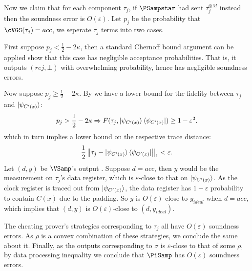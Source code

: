 \begin{prf}
	
	
	Now we claim that for each component $\tau_j$,
	if $\PSampstar$ had sent $\tau_j^{\otimes M}$ instead then the soundness error is $O(\varepsilon)$.
	Let $p_j$ be the probability that $\cVGS(\tau_j)=acc$, we seperate $\tau_j$ terms into two cases.

	First suppose $p_j<\frac{1}{2}-2\kappa$,
	then a standard Chernoff bound argument can be applied show that this case has negligible acceptance probabilities.
	That is, it outputs $(rej, \bot)$ with overwhelming probability, hence has negligible soundness errors.

	Now suppose $p_j\geq\frac{1}{2}-2\kappa$.
	By  we have a lower bound for the fidelity between $\tau_j$ and $\ket{\psi_{C'(x)}}$:
	$$p_j>\frac{1}{2}-2\kappa\Rightarrow F(\tau_j, \ket{\psi_{C'(x)}}\bra{\psi_{C'(x)}})\geq1-\varepsilon^2.$$
	which in turn implies a lower bound on the respective trace distance:
	$$\frac{1}{2}\left\lVert\tau_j - \ket{\psi_{C'(x)}}\bra{\psi_{C'(x)}}\right\rVert_1<\varepsilon.$$
	Let $(d, y)$ be $\VSamp$'s output . Suppose $d=acc$, then $y$ would be the measurement on $\tau_j$'s data register,
	which is $\varepsilon$-close to that on $\ket{\psi_{C'(x)}}$.
	As the clock register is traced out from $\ket{\psi_{C'(x)}}$, the data register has $1-\varepsilon$ probability to contain $C(x)$ due to the padding.
	So $y$ is $O(\varepsilon)$-close to $y_{ideal}$ when $d=acc$,
	which implies that $(d, y)$ is $O(\varepsilon)$-close to $(d, y_{ideal})$.

	The cheating prover's strategies corresponding to $\tau_j$ all have $O(\varepsilon)$ soundness errors.
	As $\rho$ is a convex combination  of these strategies, we conclude the same about it.
	Finally, as the outputs corresponding to $\sigma$ is $\varepsilon$-close to that of some $\rho$,
	by data processing inequality we conclude that $\PiSamp$ has $O(\varepsilon)$ soundness errors.
\end{prf}

